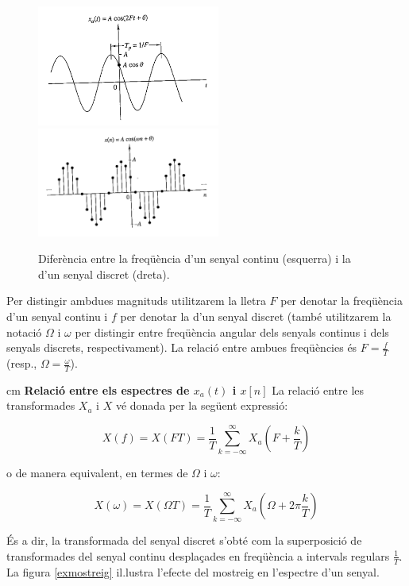 \documentclass{article}
\begin{document}
\begin{figure}[htbp]
\begin{center}
\includegraphics[width=6cm]{ciclessegon.png}
$\qquad$
\includegraphics[width=6cm]{ciclesmostra.png}
\end{center}
\caption{Difer\`encia entre la freq\"u\`encia d'un senyal continu (esquerra) i la d'un senyal discret (dreta).}
\label{figfreq}
\end{figure}


Per distingir ambdues magnituds utilitzarem la lletra $F$ per denotar la freq\"u\`encia 
d'un senyal continu i $f$ per denotar la d'un senyal discret
(tamb\'e utilitzarem la notaci\'o $\Omega$ i $\omega$ per distingir entre freq\"u\`encia angular
dels senyals continus i dels senyals discrets, respectivament).
La relaci\'o entre ambues freq\"u\`encies \'es $F=\frac{f}{T}$ (resp., $\Omega=\frac{\omega}{T}$).


 cm
\noindent
\textbf{Relaci\'o entre els espectres de $x_a(t)$ i $x[n]$}
La relaci\'o entre les transformades $X_a$ i $X$ v\'e donada per la seg\"uent expressi\'o:

\[
X(f)=X(FT)=\frac{1}{T} \sum_{k=-\infty}^\infty X_a(F+\frac{k}{T})
\]

\noindent
o de manera equivalent, en termes de $\Omega$ i $\omega$:

\[
X(\omega)=X(\Omega T)=\frac{1}{T} \sum_{k=-\infty}^\infty X_a(\Omega+2\pi\frac{k}{T})
\]

\noindent
\'Es a dir, la transformada del senyal discret s'obt\'e com la superposici\'o de transformades del senyal
continu despla\c{c}ades en freq\"u\`encia a intervals regulars $\frac{1}{T}$.
La figura \ref{exmostreig} il.lustra l'efecte del mostreig en l'espectre d'un senyal.
\end{document}
